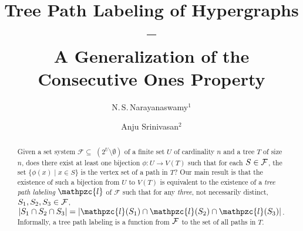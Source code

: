 \documentclass[envcountsect, envcountsame, 11pt]{../lib/llncs2e/llncs}
\def\cF{{\cal F}}
\def\F{{\mathcal F}}
\def\cl{\mathpzc{l}}
\begin{document}
\mainmatter              %
\title{Tree Path Labeling of Hypergraphs --\\
  A Generalization of
  the Consecutive Ones Property} 
\author{N.\,S.\,Narayanaswamy$^1$ \and Anju Srinivasan$^{2}$}

\maketitle
\begin{abstract}
   Given a
  set system $\F \subseteq$ $(2^{U} \setminus \emptyset)$ of a finite
  set $U$ of cardinality $n$ and a tree $T$ of size $n$, does there exist
   at least one bijection
  $\phi:U \rightarrow V(T)$ such that for each $S \in \cF$, the set $\{\phi(x)
  \mid x \in S\}$ is the vertex set of a path in $T$?    
  Our main result is that the existence of such a bijection from $U$ to $V(T)$ is
  equivalent to  the existence of a {\em tree path
  labeling} $\cl$ of $\F$ such that for any {\em three}, not necessarily distinct, $S_1, S_2, S_3 \in \cF$, $|S_1 \cap S_2 \cap S_3|=|\cl(S_1) \cap \cl(S_2) \cap \cl(S_3)|$.  Informally, a tree path labeling is a function from $\cF$ to the set of all paths in $T$.
  

\end{abstract}
\end{document}
